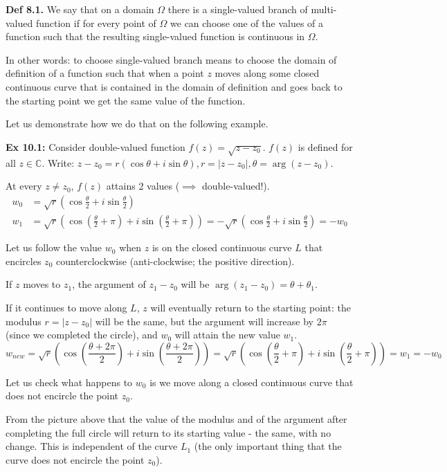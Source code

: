 \documentclass{article}
\begin{document}
\textbf{Def 8.1.} We say that on a domain $\Omega$ there is a single-valued branch of multi-valued function if for every point of $\Omega$ we can choose one of the values of a function such that the resulting single-valued function is continuous in $\Omega$.

In other words: to choose single-valued branch means to choose the domain of definition of a function such that when a point $z$ moves along some closed continuous curve that is contained in the domain of definition and goes back to the starting point we get the same value of the function.

Let us demonstrate how we do that on the following example.

\textbf{Ex 10.1:} Consider double-valued function $f(z) = \sqrt{z - z_0}$. $f(z)$ is defined for all $z \in \mathbb{C}$. Write: $z - z_0 = r(\cos \theta + i\sin \theta), r = |z - z_0|, \theta = \arg(z - z_0)$.

At every $z \neq z_0$, $f(z)$ attains 2 values ($\implies$ double-valued!).
\begin{align*}
    w_0 &= \sqrt{r}\left(\cos \frac{\theta}{2} + i\sin \frac{\theta}{2}\right) \\
    w_1 &= \sqrt{r}\left(\cos\left(\frac{\theta}{2} + \pi\right) + i\sin\left(\frac{\theta}{2} + \pi\right)\right) = -\sqrt{r}\left(\cos \frac{\theta}{2} + i\sin \frac{\theta}{2}\right) = -w_0
\end{align*}

Let us follow the value $w_0$ when $z$ is on the closed continuous curve $L$ that encircles $z_0$ counterclockwise (anti-clockwise; the positive direction).

If $z$ moves to $z_1$, the argument of $z_1 - z_0$ will be
$\arg(z_1 - z_0) = \theta + \theta_1$.

If it continues to move along $L$, $z$ will eventually return to the starting point: the modulus $r = |z - z_0|$ will be the same, but the argument will increase by $2\pi$ (since we completed the circle), and $w_0$ will attain the new value $w_1$.
$$ w_{new} = \sqrt{r}\left(\cos\left(\frac{\theta + 2\pi}{2}\right) + i\sin\left(\frac{\theta + 2\pi}{2}\right)\right) = \sqrt{r}\left(\cos\left(\frac{\theta}{2} + \pi\right) + i\sin\left(\frac{\theta}{2} + \pi\right)\right) = w_1 = -w_0 $$

Let us check what happens to $w_0$ is we move along a closed continuous curve that does not encircle the point $z_0$.

From the picture above that the value of the modulus and of the argument after completing the full circle will return to its starting value - the same, with no change. This is independent of the curve $L_1$ (the only important thing that the curve does not encircle the point $z_0$).
\end{document}
